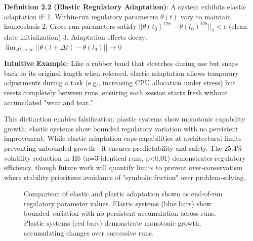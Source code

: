 \documentclass[12pt,a4paper]{report}
\newcommand{\inftyU}{\infty}
\newcommand{\thetaU}{\theta}
\newcommand{\epsilonU}{\epsilon}
\newcommand{\DeltaU}{\Delta}
\newcommand{\suponehundredtwentyeight}{^{128}}
\newcommand{\subzero}{_0}
\newcommand{\subtwo}{_2}
\begin{document}
\textbf{Definition 2.2 (Elastic Regulatory Adaptation)}: A system exhibits elastic adaptation if:
1. Within-run regulatory parameters $\thetaU(t)$ vary to maintain homeostasis
2. Cross-run parameters satisfy $||\thetaU(t\subzero)\suponehundredtwentyeight - \thetaU(t\subzero)\suponehundredtwentyeight||\subtwo < \epsilonU$ (clean-slate initialization)
3. Adaptation effects decay: $\lim_{\DeltaU t \rightarrow \inftyU} ||\thetaU(t + \DeltaU t) - \thetaU(t\subzero)|| \rightarrow 0$

\textbf{Intuitive Example}: Like a rubber band that stretches during use but snaps back to its original length when released, elastic adaptation allows temporary adjustments during a task (e.g., increasing CPU allocation under stress) but resets completely between runs, ensuring each session starts fresh without accumulated "wear and tear."

This distinction enables falsification: plastic systems show monotonic capability growth; elastic systems show bounded regulatory variation with no persistent improvement. While elastic adaptation caps capabilities at architectural limits—preventing unbounded growth—it ensures predictability and safety. The 25.4\% volatility reduction in H6 (n=3 identical runs, p<0.01) demonstrates regulatory efficiency, though future work will quantify limits to prevent over-conservatism where stability prioritizes avoidance of "symbolic friction" over problem-solving.

\begin{figure}[ht]
\centering
{}
\caption{Comparison of elastic and plastic adaptation shown as end-of-run regulatory parameter values. Elastic systems (blue bars) show bounded variation with no persistent accumulation across runs. Plastic systems (red bars) demonstrate monotonic growth, accumulating changes over successive runs.}
\label{fig:elastic_vs_plastic}
\end{figure}
\end{document}
